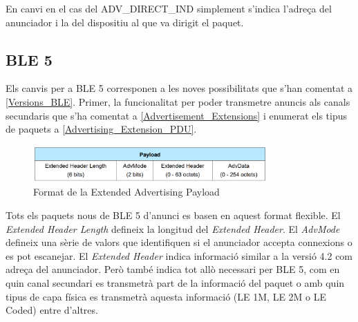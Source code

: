 En canvi en el cas del ADV\_DIRECT\_IND simplement s'indica l'adreça del anunciador i la del dispositiu al que va dirigit el paquet.

\subsection{BLE 5}
Els canvis per a BLE 5 corresponen a les noves possibilitats que s'han comentat a \ref{Versions_BLE}.
Primer, la funcionalitat per poder transmetre anuncis als canals secundaris que s'ha comentat a \ref{Advertisement_Extensions} i enumerat els tipus de paquets a \ref{Advertising_Extension_PDU}.

\begin{figure}[!h]
	\begin{center}
		\includegraphics[width=0.8\textwidth]{./images/Common_Extended_Advertising_Payload_Format.png}
		\caption{Format de la Extended Advertising Payload \cite{BLE_5_Extended_Advertising}}
	\end{center}
\end{figure}

Tots els paquets nous de BLE 5 d'anunci es basen en aquest format flexible.
El \textit{Extended Header Length} defineix la longitud del \textit{Extended Header}.
El \textit{AdvMode} defineix una sèrie de valors que identifiquen si el anunciador accepta connexions o es pot escanejar.
El \textit{Extended Header} indica informació similar a la versió 4.2 com adreça del anunciador.
Però també indica tot allò necessari per BLE 5, com en quin canal secundari es transmetrà part de la informació del paquet o amb quin tipus de capa física es transmetrà aquesta informació (LE 1M, LE 2M o LE Coded) entre d'altres.
